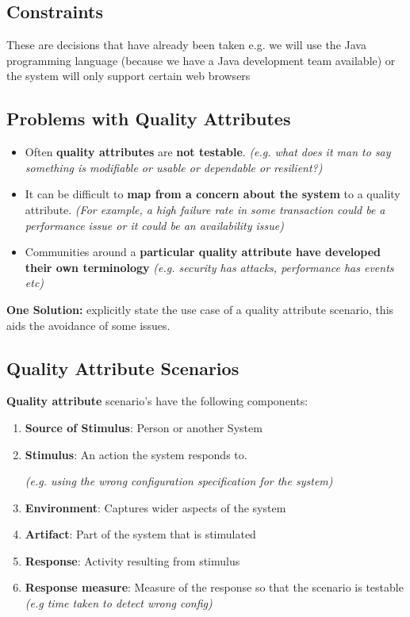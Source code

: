 \documentclass[a4paper]{article}
\begin{document}
\subsection{Constraints}
These are decisions that have already been taken e.g. we will use the Java programming language (because we have a Java development team available) or the system will only support certain web browsers


\subsection{Problems with Quality Attributes}
\begin{itemize}
\item Often \textbf{quality attributes} are \textbf{not testable}. \textit{(e.g. what does it man to say something is modifiable or usable or dependable or resilient?)}

\item It can be difficult to \textbf{map from a concern about the system} to a quality attribute. \textit{(For example, a high failure rate in some transaction could be a performance issue or it could be an availability issue)}

\item Communities around a \textbf{particular quality attribute have developed their own terminology} \textit{(e.g. security has attacks, performance has events etc)}
\end{itemize}

\textbf{One Solution: } explicitly state the use case of a quality attribute scenario, this aids the avoidance of some issues.

\subsection{Quality Attribute Scenarios}
\textbf{Quality attribute} scenario's have the following components:
\begin{enumerate}
\item \textbf{Source of Stimulus}: Person or another System
\item \textbf{Stimulus}: An action the system responds to. 

\textit{(e.g. using the wrong configuration specification for the system)}
\item \textbf{Environment}: Captures wider aspects of the system
\item \textbf{Artifact}: Part of the system that is stimulated
\item \textbf{Response}: Activity resulting from stimulus
\item \textbf{Response measure}: Measure of the response so that the scenario is testable \textit{(e.g time taken to detect wrong config)}
\end{enumerate}
\end{document}
